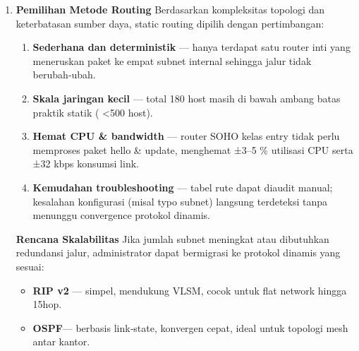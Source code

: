 \begin{enumerate}
	\item \textbf{Pemilihan Metode Routing}\newline
        Berdasarkan kompleksitas topologi dan keterbatasan sumber daya, static routing dipilih dengan pertimbangan:
        \begin{enumerate}[label=\alph*)]
          \item \textbf{Sederhana dan deterministik} — hanya terdapat satu router inti yang meneruskan paket ke empat subnet internal sehingga jalur tidak berubah‑ubah.
          \item \textbf{Skala jaringan kecil} — total 180 host masih di bawah ambang batas praktik statik ( \textless500 host).
          \item \textbf{Hemat CPU \& bandwidth} — router SOHO kelas entry tidak perlu memproses paket hello \& update, menghemat ±3–5 \% utilisasi CPU serta ±32 kbps konsumsi link.
          \item \textbf{Kemudahan troubleshooting} — tabel rute dapat diaudit manual; kesalahan konfigurasi (misal typo subnet) langsung terdeteksi tanpa menunggu convergence protokol dinamis.
        \end{enumerate}
        \vspace{3pt}
        \noindent\textbf{Rencana Skalabilitas}\newline
        Jika jumlah subnet meningkat atau dibutuhkan redundansi jalur, administrator dapat bermigrasi ke protokol dinamis yang sesuai:
        \begin{itemize}
          \item \textbf{RIP v2} — simpel, mendukung VLSM, cocok untuk flat network hingga 15hop.
          \item \textbf{OSPF}— berbasis link‑state, konvergen cepat, ideal untuk topologi mesh antar kantor.
        \end{itemize}

\end{enumerate}